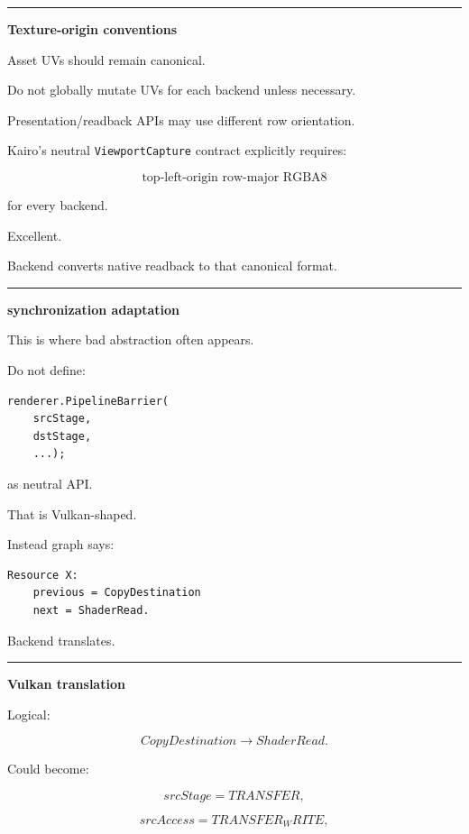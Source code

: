 \begin{center}\rule{0.5\linewidth}{0.5pt}\end{center}

\textbf{Texture-origin conventions}

Asset UVs should remain canonical.

Do not globally mutate UVs for each backend unless necessary.

Presentation/readback APIs may use different row orientation.

Kairo's neutral \texttt{ViewportCapture} contract explicitly requires:

\[
\boxed{
\text{top-left-origin row-major RGBA8}
}
\]

for every backend.

Excellent.

Backend converts native readback to that canonical format.

\begin{center}\rule{0.5\linewidth}{0.5pt}\end{center}

\textbf{synchronization adaptation}

This is where bad abstraction often appears.

Do not define:

\begin{verbatim}
renderer.PipelineBarrier(
    srcStage,
    dstStage,
    ...);
\end{verbatim}

as neutral API.

That is Vulkan-shaped.

Instead graph says:

\begin{verbatim}
Resource X:
    previous = CopyDestination
    next = ShaderRead.
\end{verbatim}

Backend translates.

\begin{center}\rule{0.5\linewidth}{0.5pt}\end{center}

\textbf{Vulkan translation}

Logical:

\[
CopyDestination
\rightarrow
ShaderRead.
\]

Could become:

\[
srcStage=TRANSFER,
\]

\[
srcAccess=TRANSFER_WRITE,
\]


